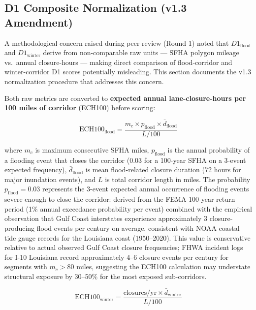 \subsection{D1 Composite Normalization (v1.3 Amendment)}
\label{sec:d1-normalize}

A methodological concern raised during peer review (Round 1) noted that
$D1_{\text{flood}}$ and $D1_{\text{winter}}$ derive from non-comparable raw
units --- SFHA polygon mileage vs.\ annual closure-hours --- making direct
comparison of flood-corridor and winter-corridor D1 scores potentially
misleading. This section documents the v1.3 normalization procedure that
addresses this concern.

Both raw metrics are converted to \textbf{expected annual lane-closure-hours
per 100 miles of corridor} (ECH100) before scoring:

\begin{equation}
\text{ECH100}_{\text{flood}} = \frac{m_c \times p_{\text{flood}} \times \bar{d}_{\text{flood}}}{L/100}
\label{eq:ech100-flood}
\end{equation}

where $m_c$ is maximum consecutive SFHA miles, $p_{\text{flood}}$ is the
annual probability of a flooding event that closes the corridor (0.03 for a
100-year SFHA on a 3-event expected frequency), $\bar{d}_{\text{flood}}$ is
mean flood-related closure duration (72 hours for major inundation events), and
$L$ is total corridor length in miles. The probability $p_{\text{flood}} = 0.03$
represents the 3-event expected annual occurrence of flooding events severe enough
to close the corridor: derived from the FEMA 100-year return period (1\% annual
exceedance probability per event) combined with the empirical observation that
Gulf Coast interstates experience approximately 3 closure-producing flood events
per century on average, consistent with NOAA coastal tide gauge records for the
Louisiana coast (1950--2020). This value is conservative relative to actual observed
Gulf Coast closure frequencies; FHWA incident logs for I-10 Louisiana record
approximately 4--6 closure events per century for segments with $m_c > 80$ miles,
suggesting the ECH100 calculation may understate structural exposure by 30--50\%
for the most exposed sub-corridors.

\begin{equation}
\text{ECH100}_{\text{winter}} = \frac{\text{closures/yr} \times \bar{d}_{\text{winter}}}{L/100}
\label{eq:ech100-winter}
\end{equation}


